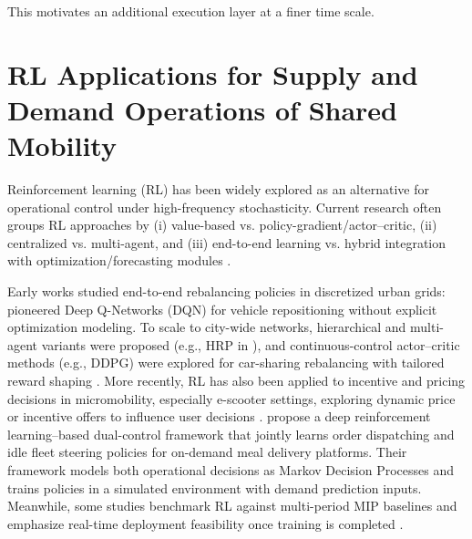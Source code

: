This motivates an additional execution layer at a finer time scale.


\section{RL Applications for Supply and Demand Operations of Shared Mobility}



Reinforcement learning (RL) has been widely explored as an alternative for operational control under high-frequency stochasticity. Current research often groups RL approaches by (i) value-based vs. policy-gradient/actor--critic, (ii) centralized vs. multi-agent, and (iii) end-to-end learning vs. hybrid integration with optimization/forecasting modules \parencite{gao2025uncertainties}.

Early works studied end-to-end rebalancing policies in discretized urban grids: \textcite{wen2017} pioneered Deep Q-Networks (DQN) for vehicle repositioning without explicit optimization modeling. To scale to city-wide networks, hierarchical and multi-agent variants were proposed (e.g., HRP in \textcite{pan2019}), and continuous-control actor--critic methods (e.g., DDPG) were explored for car-sharing rebalancing with tailored reward shaping \parencite{ren2020}. More recently, RL has also been applied to incentive and pricing decisions in micromobility, especially e-scooter settings, exploring dynamic price or incentive offers to influence user decisions \parencite{yun2024price, losapio2022smart}. \textcite{cheng2025real} propose a deep reinforcement learning–based dual-control framework that jointly learns order dispatching and idle fleet steering policies for on-demand meal delivery platforms. Their framework models both operational decisions as Markov Decision Processes and trains policies in a simulated environment with demand prediction inputs. Meanwhile, some studies benchmark RL against multi-period MIP baselines and emphasize real-time deployment feasibility once training is completed \parencite{liang2024reinforcement}.

